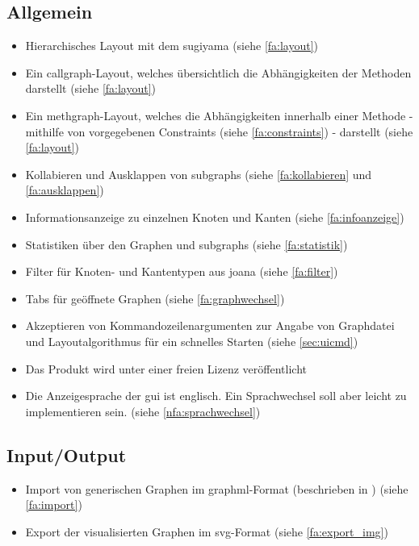 \subsection{Allgemein}
  \begin{itemize}
    \item Hierarchisches Layout mit dem \gls{sugiyama} (siehe \ref{fa:layout})
    \item Ein \gls{callgraph}-Layout, welches übersichtlich die Abhängigkeiten der Methoden darstellt (siehe \ref{fa:layout})
    \item Ein \gls{methgraph}-Layout, welches die Abhängigkeiten innerhalb einer Methode - mithilfe von vorgegebenen Constraints (siehe \ref{fa:constraints}) - darstellt (siehe \ref{fa:layout})
    \item Kollabieren und Ausklappen von \glspl{subgraph} (siehe \ref{fa:kollabieren} und \ref{fa:ausklappen})
    \item Informationsanzeige zu einzelnen Knoten und Kanten (siehe \ref{fa:infoanzeige})
    \item Statistiken über den Graphen und \glspl{subgraph} (siehe \ref{fa:statistik})
    \item Filter für Knoten- und Kantentypen aus \gls{joana} (siehe \ref{fa:filter})
    \item Tabs für geöffnete Graphen (siehe \ref{fa:graphwechsel})
    \item Akzeptieren von Kommandozeilenargumenten zur Angabe von Graphdatei und Layoutalgorithmus für ein schnelles Starten (siehe \autoref{sec:uicmd})
    \item Das Produkt wird unter einer freien Lizenz veröffentlicht
    \item Die Anzeigesprache der \gls{gui} ist englisch. Ein Sprachwechsel soll aber leicht zu implementieren sein. (siehe \ref{nfa:sprachwechsel})
  \end{itemize}

\subsection{Input/Output}
  \begin{itemize}
    \item Import von generischen Graphen im \gls{graphml}-Format (beschrieben in ) (siehe \ref{fa:import})
    \item Export der visualisierten Graphen im \gls{svg}-Format (siehe \ref{fa:export_img})
  \end{itemize}

